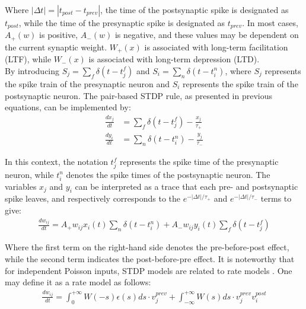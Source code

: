 \noindent Where $\left| \Delta t \right| = \left| t_{post} - t_{prev} \right|$, the time of the postsynaptic spike is designated as $t_{post}$, while the time of the presynaptic spike is designated as $t_{prev}$. In most cases, $A_+(w)$ is positive, $A_-(w)$ is negative, and these values may be dependent on the current synaptic weight. $W_+ (x)$ is associated with long-term facilitation (LTF), while $W_- (x)$ is associated with long-term depression (LTD). \\

\noindent By introducing $S_j = \sum_{f}^{} \delta\left( t - t_j^f \right) $ and $S_i = \sum_{n}^{} \delta\left( t - t_i^n \right) $,  where $S_j$ represents the spike train of the presynaptic neuron and $S_i$ represents the spike train of the postsynaptic neuron. The pair-based STDP rule, as presented in previous equations, can be implemented by:
\begin{align}
\frac{dx_j}{dt} &= \sum_{f}^{}\delta\left( t - t_j^f \right) - \frac{x_j}{\tau_+} \label{eq:6.6} \\
\frac{dy_i}{dt} &= \sum_{n}^{}\delta\left( t - t_i^n \right) - \frac{y_j}{\tau_-} \label{eq:6.7} 
\end{align}


\noindent In this context, the notation $t_j^f$ represents the spike time of the presynaptic neuron, while $t_i^n$ denotes the spike times of the postsynaptic neuron. The variables $x_j$ and $y_i$ can be interpreted as a trace that each pre- and postsynaptic spike leaves, and respectively corresponds to the $e^{-\left| \Delta t \right| / \tau_+} $ and $e^{-\left| \Delta t \right| / \tau_-}$ terms to give:
\begin{align}
\frac{dw_{ij}}{dt} = A_+ w_{ij}x_i(t) \sum_{n}\delta\left( t - t_i^n \right) + A_-w_{ij}y_i(t)\sum_{f}\delta\left( t - t_j^f \right) \label{eq:6.8} 
\end{align}

\noindent Where the first term on the right-hand side denotes the pre-before-post effect, while the second term indicates the post-before-pre effect. It is noteworthy that for independent Poisson inputs, STDP models are related to rate models \cite{gerstner2014neuronal}. One may define it as a rate model as follows:
\begin{align}
\frac{dw_{ij}}{dt} = \int_{0}^{+\infty } W(-s)\epsilon(s)ds\cdot v_{j}^{prev} + \int_{-\infty }^{+\infty } W(s)ds \cdot v_j^{prev}v_i^{post} \label{eq:6.9}
\end{align}



